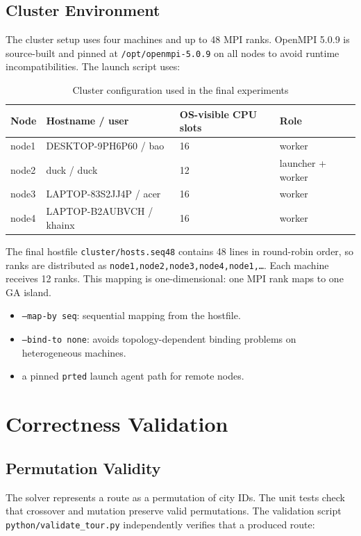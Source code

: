 \documentclass[11pt,a4paper]{article}
\begin{document}
\subsection{Cluster Environment}
The cluster setup uses four machines and up to 48 MPI ranks. OpenMPI 5.0.9 is
source-built and pinned at \texttt{/opt/openmpi-5.0.9} on all nodes to avoid
runtime incompatibilities. The launch script uses:

\begin{table}[H]
\centering
\caption{Cluster configuration used in the final experiments}
\begin{tabular}{llll}
\toprule
Node & Hostname / user & OS-visible CPU slots & Role \\
\midrule
node1 & DESKTOP-9PH6P60 / bao & 16 & worker \\
node2 & duck / duck & 12 & launcher + worker \\
node3 & LAPTOP-83S2JJ4P / acer & 16 & worker \\
node4 & LAPTOP-B2AUBVCH / khainx & 16 & worker \\
\bottomrule
\end{tabular}
\end{table}

The final hostfile \texttt{cluster/hosts.seq48} contains 48 lines in
round-robin order, so ranks are distributed as
\texttt{node1,node2,node3,node4,node1,\ldots}. Each machine receives 12 ranks.
This mapping is one-dimensional: one MPI rank maps to one GA island.

\begin{itemize}[leftmargin=*]
  \item \texttt{--map-by seq}: sequential mapping from the hostfile.
  \item \texttt{--bind-to none}: avoids topology-dependent binding problems on
  heterogeneous machines.
  \item a pinned \texttt{prted} launch agent path for remote nodes.
\end{itemize}
\newpage

\section{Correctness Validation}

\subsection{Permutation Validity}
The solver represents a route as a permutation of city IDs. The unit tests check
that crossover and mutation preserve valid permutations. The validation script
\texttt{python/validate\_tour.py} independently verifies that a produced route:
\end{document}
